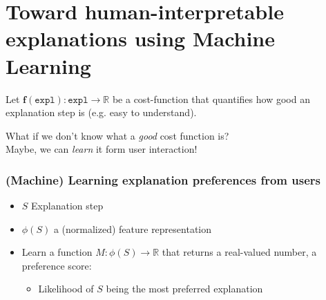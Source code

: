 \documentclass{beamer}
\renewcommand\emph[1]{{\color{vuborange}#1}}
\begin{document}
				\section{Toward human-interpretable explanations using Machine Learning}


		 \begin{frame}
	\tableofcontents[currentsection]
\end{frame}			


\begin{frame}

	\begin{mybox}
	Let $\mathbf{f}(\mathtt{expl}): \mathtt{expl} \rightarrow \mathbb{R}$ be a cost-function that quantifies how good an explanation step is (e.g. easy to understand).
\end{mybox}\pause

\begin{center}
	What if we don't know what a \textit{\emph{good}} cost function is? \pause \\
	Maybe, we can \textit{\emph{learn}} it form user interaction! \Cooley 
\end{center}
\end{frame}

\begin{frame}
	\frametitle{(Machine) Learning explanation preferences from users}
	\begin{itemize}
		\item $S$ Explanation step 
		\item $\phi(S)$ a (normalized) feature representation
		\item Learn a function $M: \phi(S) \rightarrow \mathbb{R}$ that returns a real-valued number, a preference score:
		\begin{itemize}
			\item Likelihood of $S$ being the most preferred explanation
		\end{itemize}
	\end{itemize}
\end{frame}
\end{document}

